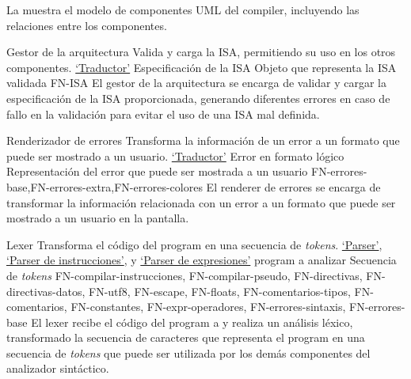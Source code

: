 La  muestra el modelo de componentes UML
\parencite{UMLSpec} del \gls{compiler}, incluyendo las relaciones entre los
componentes.


\printcomptemplate

\newcommand{\componentref}[1]{\hyperref[req:#1]{`#1'}}

\begin{component}{Gestor de la arquitectura}
    {Valida y carga la \gls{ISA}, permitiendo su uso en los otros componentes.} %
    {\componentref{Traductor}} %
    {Especificación de la \gls{ISA}} %
    {Objeto que representa la \gls{ISA} validada} %
    {FN-ISA} %
    El gestor de la arquitectura se encarga de validar y cargar la
    especificación de la \gls{ISA} proporcionada, generando diferentes errores
    en caso de fallo en la validación para evitar el uso de una \gls{ISA} mal
    definida.
\end{component}

\begin{component}{Renderizador de errores}
    {Transforma la información de un error a un formato que puede ser mostrado a un usuario.} %
    {\componentref{Traductor}} %
    {Error en formato lógico} %
    {Representación del error que puede ser mostrada a un usuario} %
    {FN-errores-base,FN-errores-extra,FN-errores-colores} %
    El \gls{renderer} de errores se encarga de transformar la información
    relacionada con un error a un formato que puede ser mostrado a un usuario en
    la pantalla.
\end{component}

\begin{component}{Lexer}
    {Transforma el código del \gls{program} en una secuencia de \textit{\glspl{token}}.} %
    {\componentref{Parser}, \componentref{Parser de instrucciones}, y \componentref{Parser de expresiones}} %
    {\Gls{program} a analizar} %
    {Secuencia de \textit{\glspl{token}}} %
    {FN-compilar-instrucciones, FN-compilar-pseudo, FN-directivas,
    FN-directivas-datos, FN-utf8, FN-escape, FN-floats, FN-comentarios-tipos,
    FN-comentarios, FN-constantes, FN-expr-operadores, FN-errores-sintaxis,
    FN-errores-base} %
    El lexer recibe el código del \gls{program} a
     y realiza un análisis léxico, transformado
    la secuencia de caracteres que representa el \gls{program} en una secuencia
    de \textit{\glspl{token}} que puede ser utilizada por los demás componentes
    del analizador sintáctico.
\end{component}

